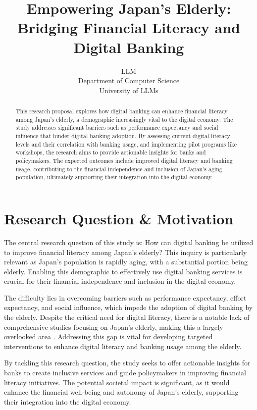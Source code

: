\documentclass{article} %
\title{Empowering Japan's Elderly: Bridging Financial Literacy and Digital Banking}
\author{LLM\\
Department of Computer Science\\
University of LLMs\\
}
\begin{document}
\maketitle

\begin{abstract}
This research proposal explores how digital banking can enhance financial literacy among Japan's elderly, a demographic increasingly vital to the digital economy. The study addresses significant barriers such as performance expectancy and social influence that hinder digital banking adoption. By assessing current digital literacy levels and their correlation with banking usage, and implementing pilot programs like workshops, the research aims to provide actionable insights for banks and policymakers. The expected outcomes include improved digital literacy and banking usage, contributing to the financial independence and inclusion of Japan's aging population, ultimately supporting their integration into the digital economy.
\end{abstract}

\section{Research Question \& Motivation}
\label{sec:intro}
The central research question of this study is: How can digital banking be utilized to improve financial literacy among Japan's elderly? This inquiry is particularly relevant as Japan's population is rapidly aging, with a substantial portion being elderly. Enabling this demographic to effectively use digital banking services is crucial for their financial independence and inclusion in the digital economy.

The difficulty lies in overcoming barriers such as performance expectancy, effort expectancy, and social influence, which impede the adoption of digital banking by the elderly. Despite the critical need for digital literacy, there is a notable lack of comprehensive studies focusing on Japan's elderly, making this a largely overlooked area \citep{Miwa2017ChangingPO}. Addressing this gap is vital for developing targeted interventions to enhance digital literacy and banking usage among the elderly.

By tackling this research question, the study seeks to offer actionable insights for banks to create inclusive services and guide policymakers in improving financial literacy initiatives. The potential societal impact is significant, as it would enhance the financial well-being and autonomy of Japan's elderly, supporting their integration into the digital economy.
\end{document}
